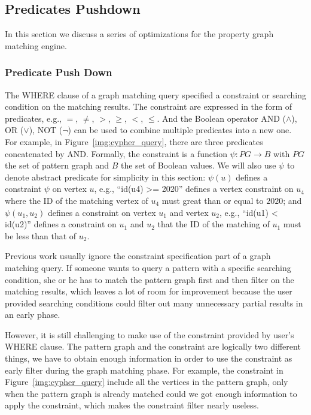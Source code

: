 \subsection{Predicates Pushdown}\label{sec:match_optimize}
In this section we discuss a series of optimizations for the property graph matching engine.
\subsubsection{Predicate Push Down}
The WHERE clause of a graph matching query specified a constraint or searching condition on the matching results.
The constraint are expressed in the form of predicates, e.g., $=$, $\neq$, $>$, $\ge$, $<$, $\le$.
And the Boolean operator AND ($\land$), OR ($\lor$), NOT ($\lnot$) can be used to combine multiple predicates into a new one.
For example, in Figure~\ref{img:cypher_query}, there are three predicates concatenated by AND\@.
Formally, the constraint is a function $\psi: PG \rightarrow B$ with $PG$ the set of pattern graph and $B$ the set of Boolean values.
We will also use $\psi$ to denote abstract predicate for simplicity in this section:
$\psi(u)$ defines a constraint $\psi$ on vertex $u$, e.g., ``{id(u4) >= 2020}'' defines a vertex constraint on $u_4$ where the ID of the matching vertex of $u_4$ must great than or equal to $2020$;
and $\psi(u_1, u_2)$ defines a constraint on vertex $u_1$ and vertex $u_2$,
e.g., ``{id(u1) < id(u2)}'' defines a constraint on $u_1$ and $u_2$ that the ID of the matching of $u_1$ must be less than that of $u_2$.

Previous work usually ignore the constraint specification part of a graph matching query.
If someone wants to query a pattern with a specific searching condition,
she or he has to match the pattern graph first and then filter on the matching results,
which leaves a lot of room for improvement because the user provided searching conditions could filter out many unnecessary
partial results in an early phase.

However, it is still challenging to make use of the constraint provided by user's WHERE clause.
The pattern graph and the constraint are logically two different things,
we have to obtain enough information in order to use the constraint as early filter during the graph matching phase.
For example, the constraint in Figure~\ref{img:cypher_query} include all the vertices in the pattern graph,
only when the pattern graph is already matched could we got enough information to apply the constraint,
which makes the constraint filter nearly useless.

